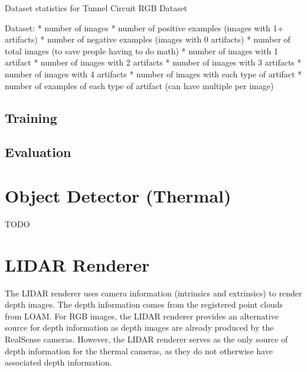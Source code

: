 
\begin{table}
	\centering
	\begin{adjustbox}{max width=.9\textwidth}
	\end{adjustbox}
	\caption{Dataset statistics for Tunnel Circuit RGB Dataset}
	\label{rgb_statistics}
\end{table}

Dataset:
* number of images
* number of positive examples (images with 1+ artifacts)
* number of negative examples (images with 0 artifacts)
* number of total images (to save people having to do math)
* number of images with 1 artifact
* number of images with 2 artifacts
* number of images with 3 artifacts
* number of images with 4 artifacts
* number of images with each type of artifact
* number of examples of each type of artifact (can have multiple per image)


 
\subsection{Training}
\subsection{Evaluation}

\section{Object Detector (Thermal)}
TODO

\section{LIDAR Renderer}

The LIDAR renderer uses camera information (intrinsics and extrinsics) to render depth images. The depth information comes from the registered point clouds from LOAM. For RGB images, the LIDAR renderer provides an alternative source for depth information as depth images are already produced by the RealSense cameras. However, the LIDAR renderer serves as the only source of depth information for the thermal cameras, as they do not otherwise have associated depth information.

